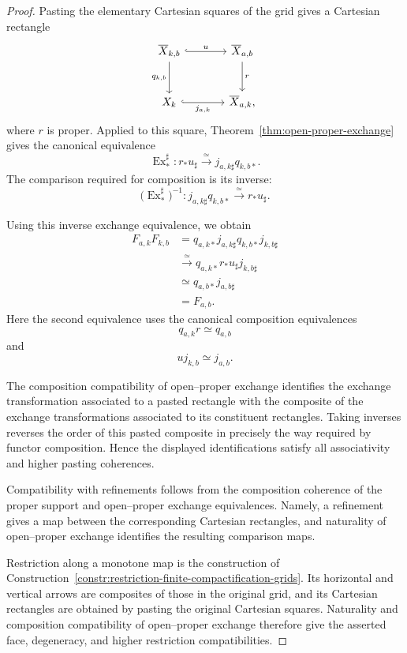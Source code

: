 \begin{proof}
Pasting the elementary Cartesian squares of the grid gives a Cartesian
rectangle
\[
\begin{tikzcd}[column sep=large,row sep=large]
    \overline X_{k,b}
        \arrow[r,hook,"u"]
        \arrow[d,"q_{k,b}"']
        &
    \overline X_{a,b}
        \arrow[d,"r"]
    \\
    X_k
        \arrow[r,hook,"j_{a,k}"']
        &
    \overline X_{a,k},
\end{tikzcd}
\]
where \(r\) is proper.  Applied to this square,
Theorem~\ref{thm:open-proper-exchange} gives the canonical equivalence
\[
    \operatorname{Ex}^{\sharp}_{*}:
    r_*u_\sharp
    \xrightarrow{\simeq}
    j_{a,k\sharp}q_{k,b*}.
\]
The comparison required for composition is its inverse:
\[
    \bigl(
      \operatorname{Ex}^{\sharp}_{*}
    \bigr)^{-1}:
    j_{a,k\sharp}q_{k,b*}
    \xrightarrow{\simeq}
    r_*u_\sharp.
\]

Using this inverse exchange equivalence, we obtain
\[
\begin{aligned}
    F_{a,k}F_{k,b}
    &=
    q_{a,k*}j_{a,k\sharp}
    q_{k,b*}j_{k,b\sharp} \\
    &\xrightarrow{\simeq}
    q_{a,k*}r_*u_\sharp j_{k,b\sharp} \\
    &\simeq
    q_{a,b*}j_{a,b\sharp} \\
    &=
    F_{a,b}.
\end{aligned}
\]
Here the second equivalence uses the canonical composition equivalences
\[
    q_{a,k}r
    \simeq
    q_{a,b}
\]
and
\[
    uj_{k,b}
    \simeq
    j_{a,b}.
\]

The composition compatibility of open--proper exchange identifies the
exchange transformation associated to a pasted rectangle with the composite
of the exchange transformations associated to its constituent rectangles.
Taking inverses reverses the order of this pasted composite in precisely the
way required by functor composition.  Hence the displayed identifications
satisfy all associativity and higher pasting coherences.

Compatibility with refinements follows from the composition coherence of
the proper support and open--proper exchange equivalences.  Namely, a
refinement gives a map between the corresponding Cartesian rectangles, and
naturality of open--proper exchange identifies the resulting comparison
maps.

Restriction along a monotone map is the construction of
Construction~\ref{constr:restriction-finite-compactification-grids}.  Its
horizontal and vertical arrows are composites of those in the original
grid, and its Cartesian rectangles are obtained by pasting the original
Cartesian squares.  Naturality and composition compatibility of
open--proper exchange therefore give the asserted face, degeneracy, and
higher restriction compatibilities.
\end{proof}

